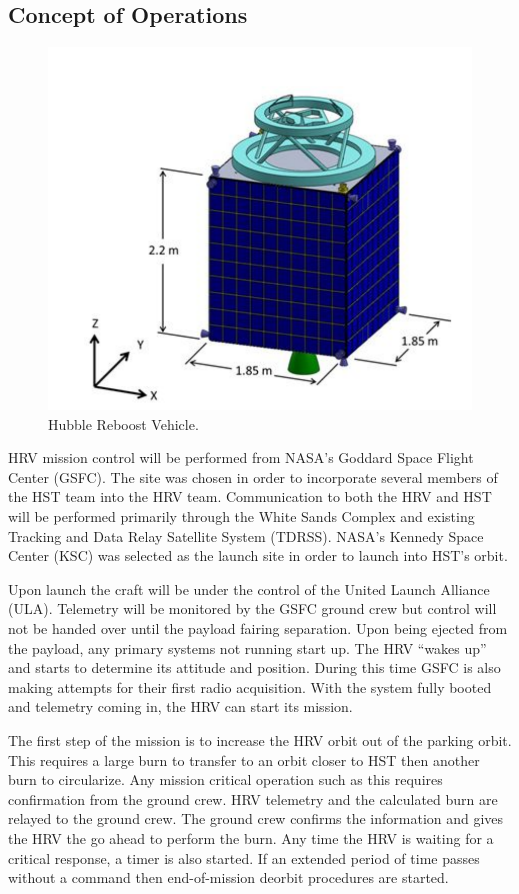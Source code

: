 \documentclass[paper=letter, fontsize=11pt]{scrartcl} %
\numberwithin{equation}{section} %
\numberwithin{figure}{section} %
\numberwithin{table}{section} %
\begin{document}
\subsection{Concept of Operations}
\begin{figure}[H]
\begin{center}
\includegraphics[width=.75\textwidth]{spacecraft_final.png}
\caption{Hubble Reboost Vehicle.}
\end{center}
\end{figure}

HRV mission control will be performed from NASA's Goddard Space Flight Center (GSFC). The site was chosen in order to incorporate several members of the HST team into the HRV team. Communication to both the HRV and HST will be performed primarily through the White Sands Complex and existing Tracking and Data Relay Satellite System (TDRSS). NASA's Kennedy Space Center (KSC) was selected as the launch site in order to launch into HST's orbit.

Upon launch the craft will be under the control of the United Launch Alliance (ULA). Telemetry will be monitored by the GSFC ground crew but control will not be handed over until the payload fairing separation. Upon being ejected from the payload, any primary systems not running start up. The HRV ``wakes up'' and starts to determine its attitude and position. During this time GSFC is also making attempts for their first radio acquisition. With the system fully booted and telemetry coming in, the HRV can start its mission.

The first step of the mission is to increase the HRV orbit out of the parking orbit. This requires a large burn to transfer to an orbit closer to HST then another burn to circularize. Any mission critical operation such as this requires confirmation from the ground crew. HRV telemetry and the calculated burn are relayed to the ground crew. The ground crew confirms the information and gives the HRV the go ahead to perform the burn. Any time the HRV is waiting for a critical response, a timer is also started. If an extended period of time passes without a command then end-of-mission deorbit procedures are started.
\end{document}
